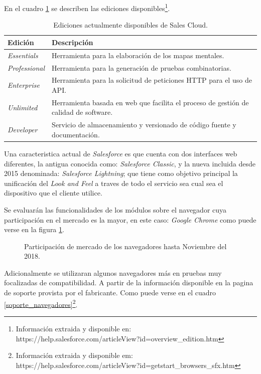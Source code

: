 En el cuadro \ref{ediciones} se describen las ediciones
disponibles\footnote{Información extraida y disponible en:
https://help.salesforce.com/articleView?id=overview\_edition.htm}.

\begin{table}
\centering
\begin{tabular}{|l|p{9.0cm}|}
\hline
\textbf{Edición} & \textbf{Descripción} \\
\hline
\emph{Essentials} & Herramienta para la elaboración de los mapas mentales. \\
\emph{Professional} & Herramienta para la generación de pruebas combinatorias. \\
\emph{Enterprise} & Herramienta para la solicitud de peticiones HTTP para el uso de API.\\
\emph{Unlimited} & Herramienta basada en web que facilita el proceso de gestión de calidad de software. \\
\emph{Developer} & Servicio de almacenamiento y versionado de código fuente y documentación. \\
\hline
\end{tabular}
\caption{Ediciones actualmente disponibles de Sales Cloud.}
\label{ediciones}
\end{table}

Una caracteristica actual de \emph{Salesforce} es que cuenta con dos interfaces
web diferentes, la antigua conocida como: \emph{Salesforce Classic}, y la nueva
incluida desde 2015 denominada: \emph{Salesforce Lightning}; que tiene como
objetivo principal la unificación del \emph{Look and Feel} a traves de todo el
servicio sea cual sea el dispositivo que el cliente utilice\cite{McCarthy}.

Se evaluarán las funcionalidades de los módulos sobre el navegador cuya
participación en el mercado es la mayor, en este caso: \emph{Google Chrome}
como puede verse en la figura \ref{software}.

\begin{figure}
\centering

\caption{Participación de mercado de los navegadores hasta Noviembre del 2018.}
\label{software}
\end{figure}

Adicionalmente se utilizaran algunos navegadores más en pruebas muy focalizadas
de compatibilidad. A partir de la información disponible en la pagina de soporte
provista por el fabricante. Como puede verse en el cuadro
\ref{soporte_navegadores}\footnote{Información extraida y disponible em:
https://help.salesforce.com/articleView?id=getstart\_browsers\_sfx.htm}.

